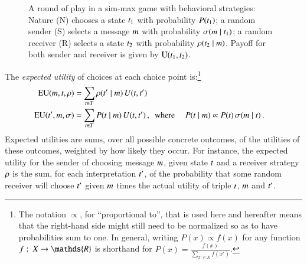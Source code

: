 \documentclass[fleqn,reqno,10pt]{article}
\newcommand{\similarity}{\ensuremath{\mathrm{Sim}}} %
\renewcommand{\Pr}{\ensuremath{P}}
\begin{document}
\begin{figure}
  \centering


  \caption{A round of play in a sim-max game with behavioral strategies: Nature (N) chooses a
    state $t_{\mathrm{1}}$ with probability $\Pr(\mystate{1})$; a random sender (S) selects a
    message $m$ with probability $\sigma(m \mid t_{\mathrm{1}})$; a random receiver
    (R) selects a state $t_{\mathrm{2}}$ with probability $\rho(t_{\mathrm{2}} \mid m)$.
    Payoff for both sender and receiver is given by $\mathrm{U}(t_{\mathrm{1}}, t_{\mathrm{2}})$.}
  \label{fig:sim-max-illustration}
\end{figure}

The \emph{expected utility} of choices at each choice point is:\footnote{The notation
  $\propto$, for ``proportional to'', that is used here and hereafter means that the right-hand
  side might still need to be normalized so as to have probabilities sum to one. In general,
  writing $P(x) \propto f(x)$ for any function $f \mycolon X \rightarrow \mathds{R}$ is
  shorthand for $P(x) = \frac{f(x)}{\sum_{x' \in X} f(x')}$. }
\begin{align*}
  \EU(\messg, \state, \Rstrat) & = \sum_{\state \in \States}
  \Rstrat(\state' \probbar \messg) \myts U(\state, \state') \\
  \EU(\state', \messg, \Sstrat) & = \sum_{\state \in
    \States} P(\state \probbar \messg)  \myts
  U(\state, \state')\,, \text{\ \  where } &
P(\state \probbar \messg) & \propto \Pr(\state) \myts \Sstrat(\messg \probbar \state) \,.
\end{align*}
Expected utilities are sums, over all possible concrete outcomes, of the utilities of these
outcomes, weighted by how likely they occur. For instance, the expected utility for the sender
of choosing message $m$, given state $t$ and a receiver strategy $\rho$ is the
sum, for each interpretation $t'$, of the probability that some random receiver will
choose $t'$ given $m$ times the actual utility of triple $t$, $m$ and
$t'$.
\end{document}
